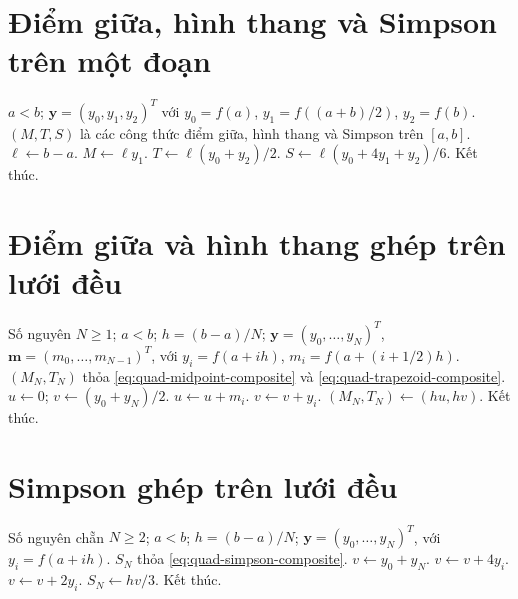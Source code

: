 \documentclass[12pt,a4paper,oneside]{book}
\numberwithin{algorithm}{chapter}
\theoremstyle{definition}
\begin{document}
\section{Điểm giữa, hình thang và Simpson trên một đoạn}
\begin{algorithm}[H]
\caption{Tính ba công thức tích phân trên một đoạn}
\label{alg:quad-single}
\begin{algorithmic}[1]
\Require $a<b$; $\boldsymbol y=(y_0,y_1,y_2)^T$ với $y_0=f(a)$, $y_1=f((a+b)/2)$, $y_2=f(b)$.
\Ensure $(M,T,S)$ là các công thức điểm giữa, hình thang và Simpson trên $[a,b]$.
\State $\ell\gets b-a$.
\State $M\gets\ell y_1$.
\State $T\gets\ell(y_0+y_2)/2$.
\State $S\gets\ell(y_0+4y_1+y_2)/6$.
\State Kết thúc.
\end{algorithmic}
\end{algorithm}

\section{Điểm giữa và hình thang ghép trên lưới đều}
\begin{algorithm}[H]
\caption{Tính công thức điểm giữa và hình thang ghép}
\label{alg:quad-midpoint-trapezoid-composite}
\begin{algorithmic}[1]
\Require Số nguyên $N\geq1$; $a<b$; $h=(b-a)/N$; $\boldsymbol y=(y_0,\ldots,y_N)^T$, $\boldsymbol m=(m_0,\ldots,m_{N-1})^T$, với $y_i=f(a+ih)$, $m_i=f(a+(i+1/2)h)$.
\Ensure $(M_N,T_N)$ thỏa \eqref{eq:quad-midpoint-composite} và \eqref{eq:quad-trapezoid-composite}.
\State $u\gets0$; $v\gets(y_0+y_N)/2$.
  \State $u\gets u+m_i$.
    \State $v\gets v+y_i$.
  \EndIf
\EndFor
\Statex
\State $(M_N,T_N)\gets(hu,hv)$.
\State Kết thúc.
\end{algorithmic}
\end{algorithm}

\section{Simpson ghép trên lưới đều}
\begin{algorithm}[H]
\caption{Tính công thức Simpson ghép}
\label{alg:quad-simpson-composite}
\begin{algorithmic}[1]
\Require Số nguyên chẵn $N\geq2$; $a<b$; $h=(b-a)/N$; $\boldsymbol y=(y_0,\ldots,y_N)^T$, với $y_i=f(a+ih)$.
\Ensure $S_N$ thỏa \eqref{eq:quad-simpson-composite}.
\State $v\gets y_0+y_N$.
    \State $v\gets v+4y_i$.
  \Else
    \State $v\gets v+2y_i$.
  \EndIf
\EndFor
\Statex
\State $S_N\gets hv/3$.
\State Kết thúc.
\end{algorithmic}
\end{algorithm}
\end{document}
